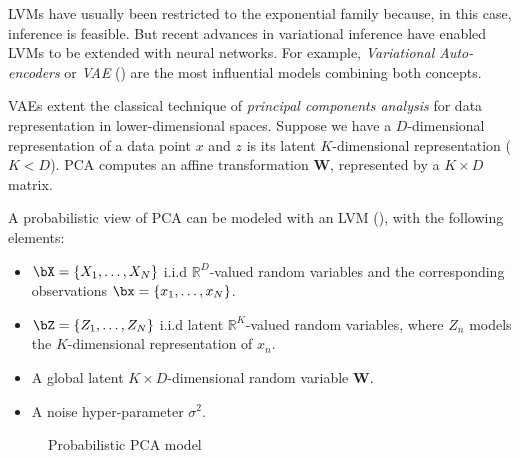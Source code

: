 LVMs have usually been restricted to the exponential family because, in this case, inference is feasible. But recent advances in variational inference have enabled LVMs to be extended with neural networks. For example, \emph{Variational Auto-encoders} or \emph{VAE} (\cite{kingma2013auto}) are the most influential models combining both concepts.

VAEs extent the classical technique of \emph{principal components analysis} for data representation in lower-dimensional spaces. Suppose we have a \(D\)-dimensional representation of a data point \(x\) and \(z\) is its latent \(K\)-dimensional representation (\(K < D\)). PCA computes an affine transformation \(\bm{W}\), represented by a \(K \times D\) matrix.


A probabilistic view of PCA can be modeled with an LVM (\cite{tipping1999probabilistic}), with the following elements:

\begin{itemize}
  \item \(\bX = \{X_{1},\dots,X_{N}\}\) i.i.d \(\mathbb{R}^{D}\)-valued random variables and the corresponding observations \(\bx = \{x_{1},\dots, x_{N}\}\).
  \item \(\bZ = \{Z_{1}, \dots, Z_{N}\}\) i.i.d latent \(\mathbb{R}^{K}\)-valued random variables, where \(Z_{n}\) models the \(K\)-dimensional representation of \(x_{n}\).
  \item A global latent \(K\times D\)-dimensional random variable \(\bm{W}\).
  \item A noise hyper-parameter \(\sigma^{2}\).
\end{itemize}

\begin{figure}[h!]
  \centering
  \caption{Probabilistic PCA model}\label{fig:ppca}
\end{figure}



